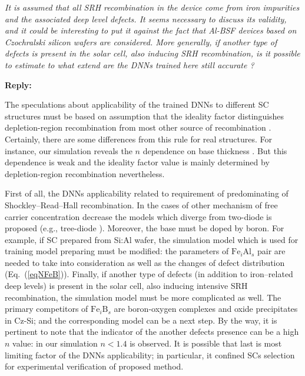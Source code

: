 \documentclass[num-refs]{wiley-article} %
\begin{document}
\emph{It is assumed that all SRH recombination in the device come from iron impurities and the associated deep level defects.
It seems necessary to discuss its validity, and it could be interesting to put it against the fact that Al-BSF devices based on Czochralski silicon wafers are considered.
More generally, if another type of defects is present in the solar cell, also inducing SRH recombination,
is it possible to estimate to what extend are the DNNs trained here still accurate ? }

\vspace{0.5cm}
\noindent
\textcolor[rgb]{0.51,0.00,0.00}{\textbf{Reply:}}

The speculations about applicability of the trained DNNs to different SC structures
must be based on assumption that the ideality factor distinguishes
depletion-region recombination from most other source of recombination \cite{Breitenstein2013,n2McIntosh}.
Certainly, there are some differences from this rule for real structures.
For instance, our simulation reveals the $n$ dependence on base thickness \cite{OlikhJPS}.
But this dependence is weak and the ideality factor value is mainly determined
by depletion-region recombination nevertheless.

First of all, the DNNs applicability related to requirement of 
predominating of Shockley–Read–Hall recombination.
In the cases of other mechanism of free carrier concentration decrease the
models which diverge from two-diode is proposed (e.g., tree-diode \cite{TreeDiode,Shah}).
Moreover, the base must be doped by boron.
For example, if SC prepared from Si:Al wafer,
the simulation model which is used for training model preparing must
be modified: the parameters of $\mathrm{Fe}_i\mathrm{Al}_s$ pair are needed 
to take into consideration as well as the changes of defect 
distribution (Eq.~(\ref{eqNFeB})).
Finally, if another type of defects (in addition to iron--related deep levels)
is present in the solar cell, also inducing intensive SRH recombination,
the simulation model must be more complicated as well.
The primary competitors of $\mathrm{Fe}_i\mathrm{B}_s$  are  boron-oxygen complexes \cite{LIDRev,LIDRev2}
and oxide precipitates \cite{MurphySC2014,Oxide:Chen} in Cz-Si; 
and the corresponding model can be a next step.
By the way, it is pertinent to note that the indicator of 
the another defects presence can be a high $n$ value:
in our simulation $n<1.4$ is observed.
It is possible that last is most limiting factor of the DNNs applicability;
in particular, it confined SCs selection for experimental verification of proposed method.
 
\end{document}
